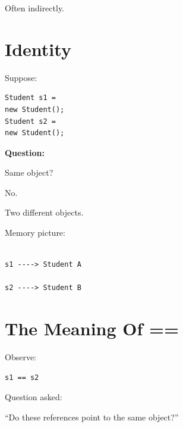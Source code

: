\documentclass[11pt,a4paper]{book}
\begin{document}
Often indirectly.


\section{Identity}

Suppose:

\begin{verbatim} 
Student s1 =
new Student();
Student s2 =
new Student();
\end{verbatim}


\textbf{Question:}

Same object?


No.


Two different objects.


Memory picture:

\begin{verbatim}

s1 ----> Student A

s2 ----> Student B

\end{verbatim}


\section{The Meaning Of ==}

Observe:

\begin{verbatim} 
s1 == s2
\end{verbatim}


Question asked:


``Do these references point
to the same object?''

\end{document}
